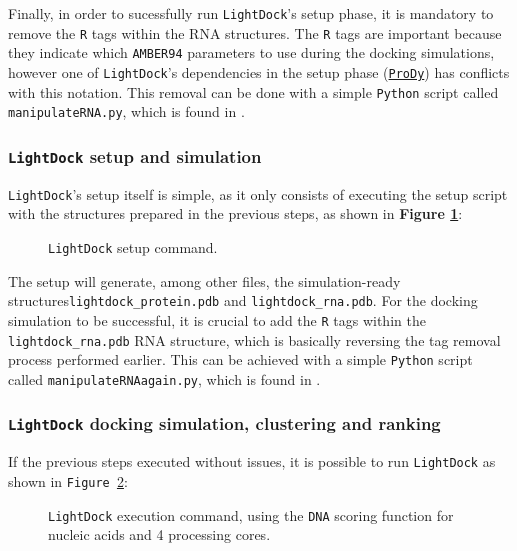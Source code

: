 Finally, in order to sucessfully run \texttt{LightDock}'s setup phase, it is mandatory to remove the \texttt{R} tags within the RNA structures. The \texttt{R} tags are important because they indicate which \texttt{AMBER94} parameters to use during the docking simulations, however one of \texttt{LightDock}'s dependencies in the setup phase (\href{http://prody.csb.pitt.edu/}{\texttt{ProDy}}) has conflicts with this notation. This removal can be done with a simple \texttt{Python} script called \texttt{manipulateRNA.py}, which is found in \textbf{}.

\subsubsection{\texttt{LightDock} setup and simulation}

\texttt{LightDock}'s setup itself is simple, as it only consists of executing the setup script with the structures prepared in the previous steps, as shown in \textbf{Figure \ref{fig:lightdocksetup}}:

\begin{figure}[htbp!]
    
    \caption{\texttt{LightDock} setup command.}
    \label{fig:lightdocksetup}
\end{figure}

The setup will generate, among other files, the simulation-ready structures\linebreak \texttt{lightdock\_protein.pdb} and \texttt{lightdock\_rna.pdb}. For the docking simulation to be successful, it is crucial to add the \texttt{R} tags within the \texttt{lightdock\_rna.pdb} RNA structure, which is basically reversing the tag removal process performed earlier. This can be achieved with a simple \texttt{Python} script called \texttt{manipulateRNAagain.py}, which is found in \textbf{}.\\

\subsubsection{\texttt{LightDock} docking simulation, clustering and ranking}

If the previous steps executed without issues, it is possible to run \texttt{LightDock} as shown in \texttt{Figure \ref{fig:lightdockexec}}:

\begin{figure}[htbp!]
    
    \caption[\texttt{LightDock} execution command.]{\texttt{LightDock} execution command, using the \texttt{DNA} scoring function for nucleic acids and 4 processing cores.}
    \label{fig:lightdockexec}
\end{figure}

